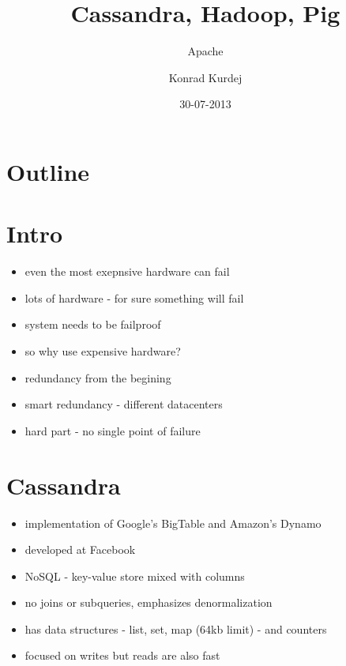 \documentclass{beamer}
\title{Cassandra, Hadoop, Pig}
\subtitle{Apache}
\author{Konrad Kurdej}
\date{30-07-2013}
\begin{document}
\begin{frame}
\titlepage
\end{frame}
\section*{Outline}
\begin{frame}
\tableofcontents
\end{frame}


\section{Intro}

\begin{frame}
    \begin{itemize}
        \item even the most exepnsive hardware can fail
            \pause
        \item lots of hardware - for sure something will fail
            \pause
        \item system needs to be failproof
            \pause
        \item so why use expensive hardware?
            \pause
        \item redundancy from the begining
            \pause
        \item smart redundancy - different datacenters
            \pause
        \item hard part - no single point of failure
    \end{itemize}
\end{frame}


\section{Cassandra}

\begin{frame}
    \begin{itemize}
        \item implementation of Google's BigTable and Amazon's Dynamo
        \item developed at Facebook
        \item NoSQL - key-value store mixed with columns
        \item no joins or subqueries, emphasizes denormalization
        \item has data structures - list, set, map (64kb limit) - and counters
        \item focused on writes but reads are also fast
    \end{itemize}

\end{frame}
\end{document}

